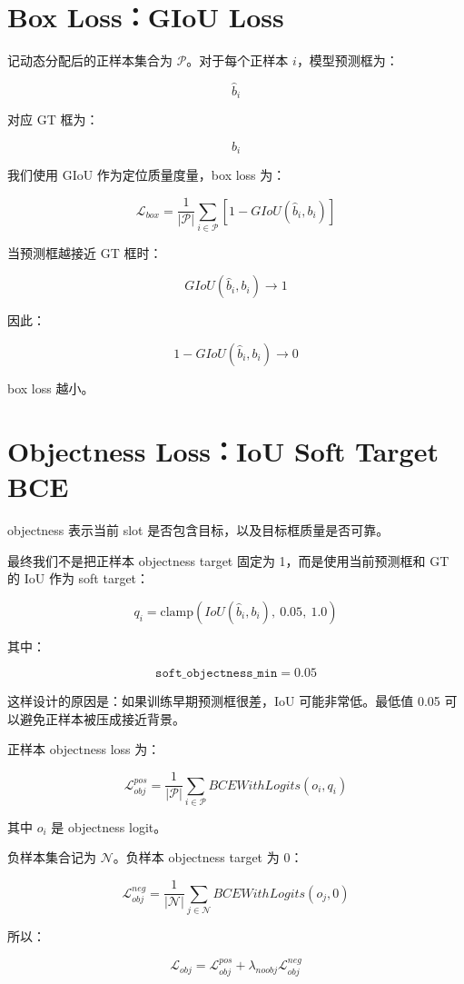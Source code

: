 \documentclass[UTF8,12pt]{ctexart}
\begin{document}
\section{Box Loss：GIoU Loss}

记动态分配后的正样本集合为 $\mathcal{P}$。对于每个正样本 $i$，模型预测框为：

\[
\hat{b}_i
\]

对应 GT 框为：

\[
b_i
\]

我们使用 GIoU 作为定位质量度量，box loss 为：

\[
\mathcal{L}_{box}
=
\frac{1}{|\mathcal{P}|}
\sum_{i \in \mathcal{P}}
\left[
1 - GIoU(\hat{b}_i, b_i)
\right]
\]

当预测框越接近 GT 框时：

\[
GIoU(\hat{b}_i,b_i) \to 1
\]

因此：

\[
1 - GIoU(\hat{b}_i,b_i) \to 0
\]

box loss 越小。

\section{Objectness Loss：IoU Soft Target BCE}

objectness 表示当前 slot 是否包含目标，以及目标框质量是否可靠。

最终我们不是把正样本 objectness target 固定为 1，而是使用当前预测框和 GT 的 IoU 作为 soft target：

\[
q_i = \text{clamp}(IoU(\hat{b}_i,b_i),\ 0.05,\ 1.0)
\]

其中：

\[
\texttt{soft\_objectness\_min}=0.05
\]

这样设计的原因是：如果训练早期预测框很差，IoU 可能非常低。最低值 0.05 可以避免正样本被压成接近背景。

正样本 objectness loss 为：

\[
\mathcal{L}_{obj}^{pos}
=
\frac{1}{|\mathcal{P}|}
\sum_{i \in \mathcal{P}}
BCEWithLogits(o_i, q_i)
\]

其中 $o_i$ 是 objectness logit。

负样本集合记为 $\mathcal{N}$。负样本 objectness target 为 0：

\[
\mathcal{L}_{obj}^{neg}
=
\frac{1}{|\mathcal{N}|}
\sum_{j \in \mathcal{N}}
BCEWithLogits(o_j, 0)
\]

所以：

\[
\mathcal{L}_{obj}
=
\mathcal{L}_{obj}^{pos}
+ \lambda_{noobj}\mathcal{L}_{obj}^{neg}
\]
\end{document}
